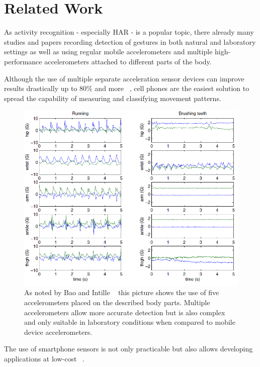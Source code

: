 \documentclass[conference]{IEEEtran}
\begin{document}
\section{Related Work}
As activity recognition - especially \ac{HAR} - is a popular topic, there already many studies and papers recording detection of gestures in both natural and laboratory settings as well as using regular mobile accelerometers and multiple high-performance accelerometers attached to different parts of the body.

Although the use of multiple separate acceleration sensor devices can improve results drastically up to 80\% and more ~\cite{Bao2004}, cell phones are the easiest solution to spread the capability of measuring and classifying movement patterns.
\begin{figure}[!htb]
\centering
\includegraphics[width=\linewidth]{multiple_accelerometers}
\caption{As noted by Bao and Intille ~\cite{Bao2004} this picture shows the use of five accelerometers placed on the described body parts. Multiple accelerometers allow more accurate detection but is also complex and only suitable in laboratory conditions when compared to mobile device accelerometers.}
\label{fig:multipleAccelerometers}
\end{figure}
The use of smartphone sensors is not only practicable but also allows developing applications at low-cost ~\cite{Brezmes2009}.
\end{document}
